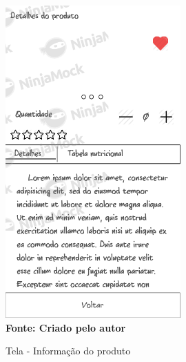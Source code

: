 \begin{figure}[ht]
	\centering	
	\caption[\hspace{0.1cm}]{Tela - Informação do produto}
	\vspace{-0.4cm}
	\includegraphics[width=0.6\textwidth]{figuras/c_produto.png}
	 \vspace{-0.2cm}
	\\\textbf{\footnotesize Fonte: Criado pelo autor }
	\label{fig:w7}
\end{figure}
\vspace{-0.5cm}

